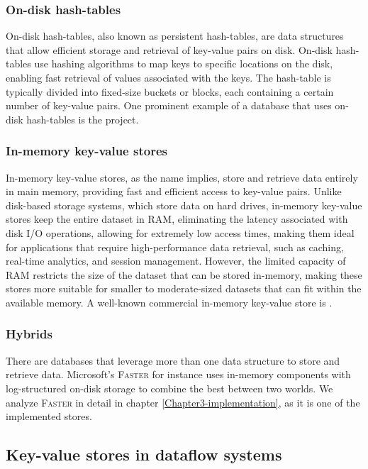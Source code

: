 \subsubsection{On-disk hash-tables}

On-disk hash-tables, also known as persistent hash-tables, are data structures that allow efficient storage and retrieval of key-value pairs on disk. On-disk hash-tables use hashing algorithms to map keys to specific locations on the disk, enabling fast retrieval of values associated with the keys. The hash-table is typically divided into fixed-size buckets or blocks, each containing a certain number of key-value pairs. One prominent example of a database that uses on-disk hash-tables is the \cite{gdbm} project.

\subsubsection{In-memory key-value stores}

In-memory key-value stores, as the name implies, store and retrieve data entirely in main memory, providing fast and efficient access to key-value pairs. Unlike disk-based storage systems, which store data on hard drives, in-memory key-value stores keep the entire dataset in RAM, eliminating the latency associated with disk I/O operations, allowing for extremely low access times, making them ideal for applications that require high-performance data retrieval, such as caching, real-time analytics, and session management. However, the limited capacity of RAM restricts the size of the dataset that can be stored in-memory, making these stores more suitable for smaller to moderate-sized datasets that can fit within the available memory. A well-known commercial in-memory key-value store is \cite{redis}.

\subsubsection{Hybrids}

There are databases that leverage more than one data structure to store and retrieve data. Microsoft's \textsc{Faster} \cite{faster} for instance uses in-memory components with log-structured on-disk storage to combine the best between two worlds. We analyze \textsc{Faster} in detail in chapter \ref{Chapter3-implementation}, as it is one of the implemented stores.

\subsection{Key-value stores in dataflow systems}

